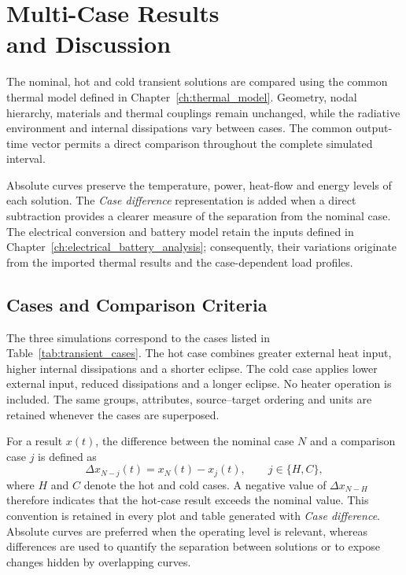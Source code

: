 \chapter[Multi-Case Results and Discussion]
{Multi-Case Results\\and Discussion}
\label{ch:results_discussion}

The nominal, hot and cold transient solutions are compared using the common
thermal model defined in Chapter~\ref{ch:thermal_model}. Geometry, nodal
hierarchy, materials and thermal couplings remain unchanged, while the
radiative environment and internal dissipations vary between cases. The
common output-time vector permits a direct comparison throughout the complete
simulated interval.

Absolute curves preserve the temperature, power, heat-flow and energy levels
of each solution. The \textit{Case difference} representation is added when a
direct subtraction provides a clearer measure of the separation from the
nominal case. The electrical conversion and battery model retain the inputs
defined in Chapter~\ref{ch:electrical_battery_analysis}; consequently, their
variations originate from the imported thermal results and the case-dependent
load profiles.


\section{Cases and Comparison Criteria}
\label{sec:comparison_criteria}

The three simulations correspond to the cases listed in
Table~\ref{tab:transient_cases}. The hot case combines greater external heat
input, higher internal dissipations and a shorter eclipse. The cold case
applies lower external input, reduced dissipations and a longer eclipse. No
heater operation is included. The same groups, attributes, source--target
ordering and units are retained whenever the cases are superposed.

For a result $x(t)$, the difference between the nominal case $N$ and a
comparison case $j$ is defined as
\begin{equation}
    \Delta x_{N-j}(t)
    =
    x_N(t)-x_j(t),
    \qquad
    j\in\{H,C\},
    \label{eq:results_case_difference}
\end{equation}
where $H$ and $C$ denote the hot and cold cases. A negative value of
$\Delta x_{N-H}$ therefore indicates that the hot-case result exceeds the
nominal value. This convention is retained in every plot and table generated
with \textit{Case difference}. Absolute curves are preferred when the
operating level is relevant, whereas differences are used to quantify the
separation between solutions or to expose changes hidden by overlapping
curves.


